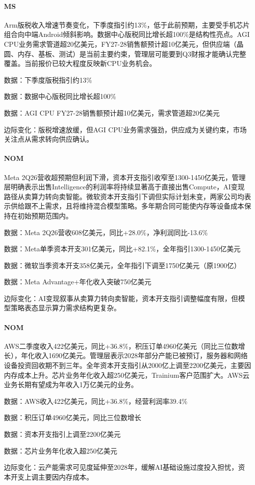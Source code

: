 \documentclass[11pt]{ctexart}
\begin{document}
\paragraph{MS} Arm版税收入增速节奏变化，下季度指引约13\%，低于此前预期，主要受手机芯片组合向中端Android倾斜影响。数据中心版税同比增长超100\%是结构性亮点。AGI CPU业务需求管道超20亿美元，FY27-28销售额预计超10亿美元，但供应端（晶圆、内存、基板、测试）是当前主要约束，管理层可能要到Q3财报才能确认完整覆盖。当前报价已较大程度反映新CPU业务机会。
{\small\color{refgray}数据：下季度版税指引约13\%\par}
{\small\color{refgray}数据：数据中心版税同比增长超100\%\par}
{\small\color{refgray}数据：AGI CPU FY27-28销售额预计超10亿美元，需求管道超20亿美元\par}
{\small\color{refgray}边际变化：版税增速放缓，但AGI CPU业务需求强劲，供应成为关键约束，市场关注点从需求转向供应确认。\par}
\paragraph{NOM} Meta 2Q26营收超预期但利润下滑，资本开支指引收窄至1300-1450亿美元，管理层明确表示出售Intelligence的利润率将持续显著高于直接出售Compute，AI变现路径从卖算力转向卖智能。微软资本开支指引下调但实际计划未变，两家公司均表示供给跟不上需求，且将维持混合模型策略。多年期合同可能使内存等设备成本保持在初始预期范围内。
{\small\color{refgray}数据：Meta 2Q26营收608亿美元，同比+28.0\%，净利润同比-13.6\%\par}
{\small\color{refgray}数据：Meta单季资本开支301亿美元，同比+82.1\%，全年指引1300-1450亿美元\par}
{\small\color{refgray}数据：微软当季资本开支358亿美元，全年指引下调至1750亿美元（原1900亿）\par}
{\small\color{refgray}数据：Meta Advantage+年化收入突破750亿美元\par}
{\small\color{refgray}边际变化：AI变现叙事从卖算力转向卖智能，资本开支指引调整幅度有限，但模型策略表态显示算力需求结构更复杂。\par}
\paragraph{NOM} AWS二季度收入422亿美元，同比+36.8\%，积压订单4960亿美元（同比三位数增长），年化收入1690亿美元。管理层表示2028年部分产能已被预订，服务器和网络设备投资回收期不到三年。全年资本开支指引从2000亿上调至2200亿美元，主要因内存成本上升。芯片业务年化收入超250亿美元，Trainium客户范围扩大。AWS云业务长期有望成为年收入1万亿美元的业务。
{\small\color{refgray}数据：AWS收入422亿美元，同比+36.8\%，经营利润率39.4\%\par}
{\small\color{refgray}数据：积压订单4960亿美元，同比三位数增长\par}
{\small\color{refgray}数据：资本开支指引上调至2200亿美元\par}
{\small\color{refgray}数据：芯片业务年化收入超250亿美元\par}
{\small\color{refgray}边际变化：云产能需求可见度延伸至2028年，缓解AI基础设施过度投入担忧，资本开支上调主要因内存成本。\par}
\end{document}
